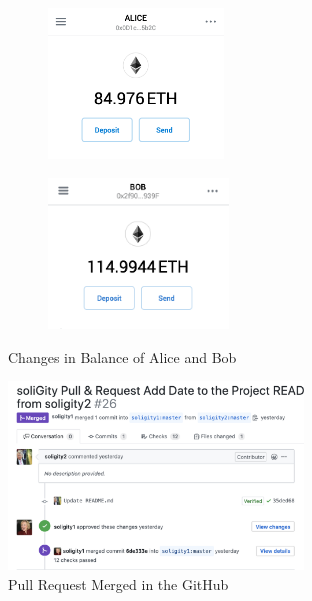 \documentclass[12pt]{article}
\renewcommand{\_}{\kern-1.5pt\textunderscore\kern-1.5pt}
\begin{document}
\begin{figure}[H]
	\centering
	\begin{subfigure}[b]{.45\textwidth}
		\centering
		\includegraphics[height=4cm]{graphs/42. metamask_alice_balance}
	\end{subfigure}
	\begin{subfigure}[b]{.45\textwidth}
		\centering
		\includegraphics[height=4cm]{graphs/43. metamask_bob_balance}
	\end{subfigure}
	\caption{Changes in Balance of Alice and Bob}
\end{figure}



\begin{figure}[H]
	\centering
	\includegraphics[height=5cm]{graphs/44. pull_request_closed}
	\caption{Pull Request Merged in the GitHub}
\end{figure}
\end{document}
